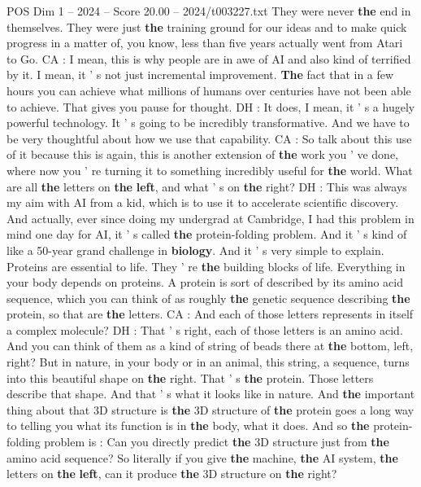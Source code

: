 \begin{textsample}{POS Dim 1 – 2024 – Score 20.00 – 2024/t003227.txt}
They were never \textbf{the} end in themselves.
They were just \textbf{the} training ground for our ideas and to make quick progress in a matter of, you know, less than five years actually went from Atari to Go.
CA : I mean, this is why people are in awe of AI and also kind of terrified by it.
I mean, it ' s not just incremental improvement. \textbf{The} fact that in a few hours you can achieve what millions of humans over centuries have not been able to achieve.
That gives you pause for thought.
DH : It does, I mean, it ' s a hugely powerful technology.
It ' s going to be incredibly transformative.
And we have to be very thoughtful about how we use that capability.
CA : So talk about this use of it because this is again, this is another extension of \textbf{the} work you ' ve done, where now you ' re turning it to something incredibly useful for \textbf{the} world.
What are all \textbf{the} letters on \textbf{the} \textbf{left}, and what ' s on \textbf{the} right?
DH : This was always my aim with AI from a kid, which is to use it to accelerate scientific discovery.
And actually, ever since doing my undergrad at Cambridge, I had this problem in mind one day for AI, it ' s called \textbf{the} protein-folding problem.
And it ' s kind of like a 50-year grand challenge in \textbf{biology}.
And it ' s very simple to explain.
Proteins are essential to life.
They ' re \textbf{the} building blocks of life.
Everything in your body depends on proteins.
A protein is sort of described by its amino acid sequence, which you can think of as roughly \textbf{the} genetic sequence describing \textbf{the} protein, so that are \textbf{the} letters.
CA : And each of those letters represents in itself a complex molecule?
DH : That ' s right, each of those letters is an amino acid.
And you can think of them as a kind of string of beads there at \textbf{the} bottom, left, right?
But in nature, in your body or in an animal, this string, a sequence, turns into this beautiful shape on \textbf{the} right.
That ' s \textbf{the} protein.
Those letters describe that shape.
And that ' s what it looks like in nature.
And \textbf{the} important thing about that 3D structure is \textbf{the} 3D structure of \textbf{the} protein goes a long way to telling you what its function is in \textbf{the} body, what it does.
And so \textbf{the} protein-folding problem is : Can you directly predict \textbf{the} 3D structure just from \textbf{the} amino acid sequence?
So literally if you give \textbf{the} machine, \textbf{the} AI system, \textbf{the} letters on \textbf{the} \textbf{left}, can it produce \textbf{the} 3D structure on \textbf{the} right?

\end{textsample}
